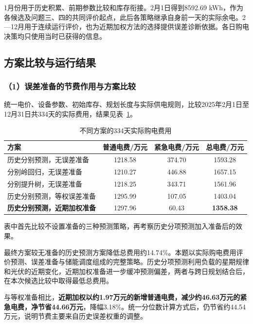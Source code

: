1月份用于历史积累、前期参数比较和库存衔接。2月1日得到8592.69 kWh，作为各候选及问题三、四的共同评价起点，此后各策略继承自身前一天的实际余电。2—12月用于连续运行评价，也为近期加权方法的选择提供误差诊断依据。各日购电决策均只使用当时已获得的信息。

\subsection{方案比较与运行结果}
\subsubsection*{（1）误差准备的节费作用与方案比较}
统一电价、设备参数、初始库存、规划长度与实际供电规则，比较2025年2月1日至12月31日共334天的实际费用，结果见表~\ref{tab:q2_model_compare}。

\begin{table}[!htbp]
\centering
\caption{不同方案的334天实际购电费用}
\label{tab:q2_model_compare}
\begin{tabular}{lccc}
\hline
方案 & 普通电费/万元 & 紧急电费/万元 & 总电费/万元 \\
\hline
历史分别预测，无误差准备
& 1218.58 & 374.70 & 1593.28 \\
分别岭回归，无误差准备
& 1210.27 & 446.88 & 1657.15 \\
分别提升树，无误差准备
& 1218.25 & 343.71 & 1561.96 \\
历史分别预测，等权误差准备
& 1295.99 & 107.05 & 1403.04 \\
\textbf{历史分别预测，近期加权准备}
& 1297.96 & 60.43 & \textbf{1358.38} \\
\hline
\end{tabular}
\end{table}

表中首先比较不设置准备的三种预测策略，再考察历史分项预测加入准备后的效果。

\begin{samepage}
最终方案较无准备的历史预测方案降低总费用约14.74\%。本题以实际购电费用评价预测、误差准备与储能调度组成的完整策略。历史分项预测利用负载的星期规律和光伏的近期变化，近期加权准备进一步缓冲预测偏差，两者与跨日规划结合后，在本次候选比较中取得最低总费用。
\par\end{samepage}

与等权准备相比，\textbf{近期加权以约1.97万元的新增普通电费，减少约46.63万元的紧急电费，净节省44.66万元}，降幅3.18\%。统一分位数计算方式后，仍节省约44.54万元，说明节费主要来自历史误差权重的调整。

